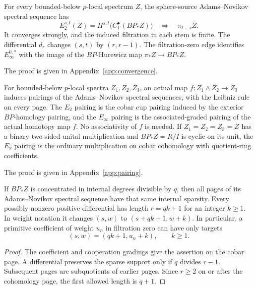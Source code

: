\begin{proposition}
\label{fw:anss}
For every bounded-below $p$-local spectrum $Z$, the sphere-source
Adams--Novikov spectral sequence has
\[
 E_2^{s,t}(Z)=H^{s,t}\bigl(C^\bullet_\Gamma(BP_*Z)\bigr)
 \quad\Longrightarrow\quad \pi_{t-s}Z.
\]
It converges strongly, and the induced filtration in each stem is finite.
The differential $d_r$ changes $(s,t)$ by $(r,r-1)$.  The filtration-zero
edge identifies $E_\infty^{0,*}$ with the image of the $BP$-Hurewicz map
$\pi_*Z\longrightarrow BP_*Z$.
\end{proposition}
The proof is given in Appendix~\ref{app:convergence}.


\begin{proposition}
\label{fw:anss-pairing}
For bounded-below $p$-local spectra $Z_1,Z_2,Z_3$, an actual map
$f:Z_1\wedge Z_2\to Z_3$ induces pairings of the
Adams--Novikov spectral sequences, with the Leibniz rule on every page.
The $E_2$ pairing is the cobar cup pairing induced by the exterior
$BP$-homology pairing, and the $E_\infty$ pairing is the associated-graded
pairing of the actual homotopy map $f$.  No associativity of $f$ is needed.
If $Z_1=Z_2=Z_3=Z$ has a binary two-sided unital multiplication and
$BP_*Z=R/I$ is cyclic on its unit, the $E_2$ pairing is the ordinary
multiplication on cobar cohomology with quotient-ring coefficients.
\end{proposition}
The proof is given in Appendix~\ref{app:pairing}.


\begin{corollary}[Sparsity]
\label{fw:sparsity}
If $BP_*Z$ is concentrated in internal degrees divisible by $q$, then all
pages of its Adams--Novikov spectral sequence have that same internal
sparsity.  Every possibly nonzero positive differential has length
$r=qk+1$ for an integer $k\geq1$.  In weight notation it changes
$(s,w)$ to $(s+qk+1,w+k)$.  In particular, a primitive coefficient of
weight $u_n$ in filtration zero can have only targets
\begin{equation}
 (s,w)=(qk+1,u_n+k),\qquad k\geq1.
 \label{fw:primitive-targets}
\end{equation}
\end{corollary}

\begin{proof}
The coefficient and cooperation gradings give the assertion on the cobar
page.  A differential preserves the sparse support only if $q$ divides
$r-1$.  Subsequent pages are subquotients of earlier pages.  Since $r\geq2$
on or after the cohomology page, the first allowed length is $q+1$.
\end{proof}

